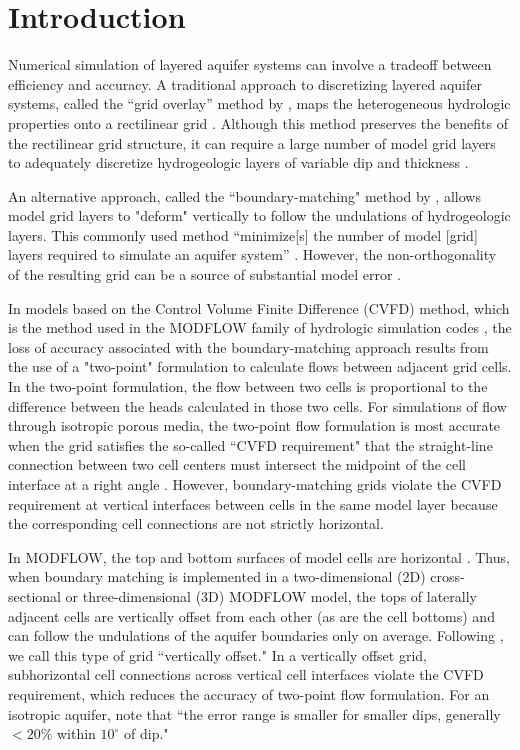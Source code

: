 \documentclass{article}
\begin{document}
\section*{Introduction}

Numerical simulation of layered aquifer systems can involve a tradeoff between efficiency and accuracy. A traditional approach to discretizing layered aquifer systems, called the ``grid overlay'' method by \cite{hoaglund2003}, maps the heterogeneous hydrologic properties onto a rectilinear grid \citep{modflow84}. Although this method preserves the benefits of the rectilinear grid structure, it can require a large number of model grid layers to adequately discretize hydrogeologic layers of variable dip and thickness \citep{Zyvoloski2006}.

An alternative approach, called the ``boundary-matching" method by \cite{hoaglund2003}, allows model grid layers to "deform" vertically to follow the undulations of hydrogeologic layers. This commonly used method ``minimize[s] the number of model [grid] layers required to simulate an aquifer system'' \citep{modflow84}. However, the non-orthogonality of the resulting grid can be a source of substantial model error \citep{hoaglund2003}.

In models based on the Control Volume Finite Difference (CVFD) method, which is the method used in the MODFLOW family of hydrologic simulation codes \citep{modflow6gwf, langevin2024}, the loss of accuracy associated with the boundary-matching approach results from the use of a "two-point" formulation to calculate flows between adjacent grid cells. In the two-point formulation, the flow between two cells is proportional to the difference between the heads calculated in those two cells. For simulations of flow through isotropic porous media, the two-point flow formulation is most accurate when the grid satisfies the so-called ``CVFD requirement" \citep{modflowusg, modflow6gwf} that the straight-line connection between two cell centers must intersect the midpoint of the cell interface at a right angle \citep{narasimhan1976integrated}. However, boundary-matching grids violate the CVFD requirement at vertical interfaces between cells in the same model layer because the corresponding cell connections are not strictly horizontal.

In MODFLOW, the top and bottom surfaces of model cells are horizontal \citep{modflow6gwf}. Thus, when boundary matching is implemented in a two-dimensional (2D) cross-sectional or three-dimensional (3D) MODFLOW model, the tops of laterally adjacent cells are vertically offset from each other (as are the cell bottoms) and can follow the undulations of the aquifer boundaries only on average. Following \cite{bardot2023}, we call this type of grid ``vertically offset." In a vertically offset grid, subhorizontal cell connections across vertical cell interfaces violate the CVFD requirement, which reduces the accuracy of two-point flow formulation. For an isotropic aquifer, \cite{hoaglund2003} note that ``the error range is smaller for smaller dips, generally $<20$\% within $10^{\circ}$ of dip."
\end{document}
